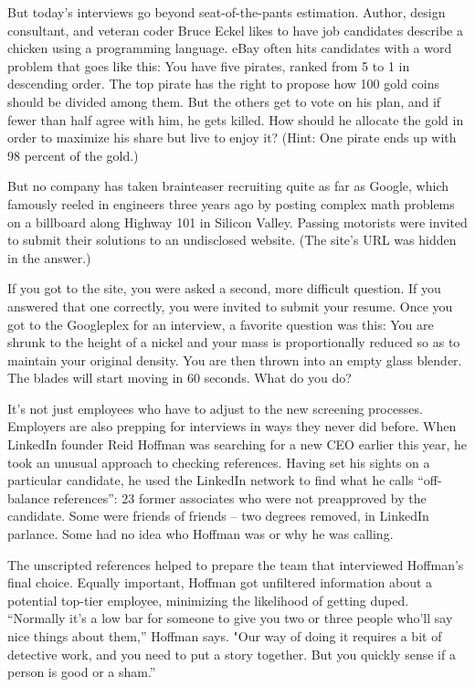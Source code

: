 \documentclass[10pt]{article}
\begin{document}
But today's interviews go beyond seat-of-the-pants estimation.  Author, design consultant, and veteran coder Bruce Eckel likes to have job candidates describe a chicken using a programming language.  eBay often hits candidates with a word problem that goes like this: You have five pirates, ranked from 5 to 1 in descending order.  The top pirate has the right to propose how 100 gold coins should be divided among them.  But the others get to vote on his plan, and if fewer than half agree with him, he gets killed.  How should he allocate the gold in order to maximize his share but live to enjoy it?  (Hint: One pirate ends up with 98 percent of the gold.)

But no company has taken brainteaser recruiting quite as far as Google, which famously reeled in engineers three years ago by posting complex math problems on a billboard along Highway 101 in Silicon Valley.  Passing motorists were invited to submit their solutions to an undisclosed website.  (The site's URL was hidden in the answer.)

If you got to the site, you were asked a second, more difficult question.  If you answered that one correctly, you were invited to submit your resume.  Once you got to the Googleplex for an interview, a favorite question was this:  You are shrunk to the height of a nickel and your mass is proportionally reduced so as to maintain your original density.  You are then thrown into an empty glass blender.  The blades will start moving in 60 seconds.  What do you do?

It's not just employees who have to adjust to the new screening processes.  Employers are also prepping for interviews in ways they never did before.  When LinkedIn founder Reid Hoffman was searching for a new CEO earlier this year, he took an unusual approach to checking references.  Having set his sights on a particular candidate, he used the LinkedIn network to find what he calls ``off-balance references'': 23 former associates who were not preapproved by the candidate. Some were friends of friends -- two degrees removed, in LinkedIn parlance.  Some had no idea who Hoffman was or why he was calling.

The unscripted references helped to prepare the team that interviewed Hoffman's final choice.  Equally important, Hoffman got unfiltered information about a potential top-tier employee, minimizing the likelihood of getting duped. ``Normally it's a low bar for someone to give you two or three people who'll say nice things about them,'' Hoffman says. "Our way of doing it requires a bit of detective work, and you need to put a story together. But you quickly sense if a person is good or a sham.''
\end{document}
